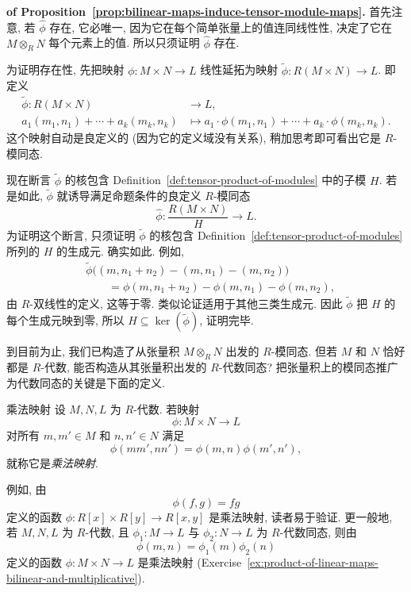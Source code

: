 \begin{Proof}\textbf{of Proposition~\ref{prop:bilinear-maps-induce-tensor-module-maps}.}\quad
首先注意, 若 $\widehat{\phi}$ 存在, 它必唯一, 因为它在每个简单张量上的值连同线性性, 决定了它在 $M\otimes_{R}N$ 每个元素上的值. 所以只须证明 $\widehat{\phi}$ 存在.

为证明存在性, 先把映射 $\phi:M\times N\to L$ 线性延拓为映射 $\widetilde{\phi}:R(M\times N)\to L$. 即定义
\[
  \begin{aligned}
    \widetilde{\phi}:R(M\times N)&\to L,\\
    a_{1}(m_{1},n_{1})+\cdots+a_{k}(m_{k},n_{k})&
      \mapsto a_{1}\cdot\phi(m_{1},n_{1})+\cdots+a_{k}\cdot\phi(m_{k},n_{k}).
  \end{aligned}
\]
这个映射自动是良定义的 (因为它的定义域没有关系), 稍加思考即可看出它是 $R$-模同态.

现在断言 $\widetilde{\phi}$ 的核包含 Definition~\ref{def:tensor-product-of-modules} 中的子模 $H$. 若是如此, $\widetilde{\phi}$ 就诱导满足命题条件的良定义 $R$-模同态
\[
  \widehat{\phi}:\frac{R(M\times N)}{H}\to L.
\]
为证明这个断言, 只须证明 $\widetilde{\phi}$ 的核包含 Definition~\ref{def:tensor-product-of-modules} 所列的 $H$ 的生成元. 确实如此. 例如,
\[
  \begin{aligned}
    &\widetilde{\phi}\bigl((m,n_{1}+n_{2})-(m,n_{1})-(m,n_{2})\bigr)\\
    &\qquad=\phi(m,n_{1}+n_{2})-\phi(m,n_{1})-\phi(m,n_{2}),
  \end{aligned}
\]
由 $R$-双线性的定义, 这等于零. 类似论证适用于其他三类生成元. 因此 $\widetilde{\phi}$ 把 $H$ 的每个生成元映到零, 所以 $H\subseteq\ker(\widetilde{\phi})$, 证明完毕.
\end{Proof}

到目前为止, 我们已构造了从张量积 $M\otimes_{R}N$ 出发的 $R$-模同态. 但若 $M$ 和 $N$ 恰好都是 $R$-代数, 能否构造从其张量积出发的 $R$-代数同态? 把张量积上的模同态推广为代数同态的关键是下面的定义.

\begin{Definition}{乘法映射}\leavevmode\label{def:multiplicative-map}
设 $M,N,L$ 为 $R$-代数. 若映射
\[
  \phi:M\times N\to L
\]
对所有 $m,m'\in M$ 和 $n,n'\in N$ 满足
\[
  \phi(mm',nn')=\phi(m,n)\phi(m',n'),
\]
就称它是\emph{乘法映射}.
\end{Definition}

例如, 由
\[
  \phi(f,g)=fg
\]
定义的函数 $\phi:R[x]\times R[y]\to R[x,y]$ 是乘法映射, 读者易于验证. 更一般地, 若 $M,N,L$ 为 $R$-代数, 且 $\phi_{1}:M\to L$ 与 $\phi_{2}:N\to L$ 为 $R$-代数同态, 则由
\[
  \phi(m,n)=\phi_{1}(m)\phi_{2}(n)
\]
定义的函数 $\phi:M\times N\to L$ 是乘法映射 (Exercise~\ref{ex:product-of-linear-maps-bilinear-and-multiplicative}).

